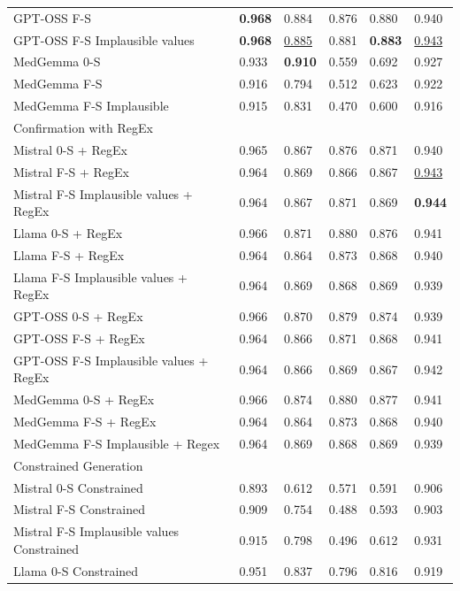 \begin{tabular}{l|llll|l}
GPT-OSS F-S  & \textbf{0.968} &  0.884  &  0.876 &  0.880 & 0.940 \\
GPT-OSS F-S Implausible values & \textbf{0.968} &  \underline{0.885}   & 0.881 &  \textbf{0.883} & \underline{0.943} \\
MedGemma 0-S  &0.933 & \textbf{0.910} & 0.559 & 0.692 & 0.927 \\
MedGemma F-S  & 0.916 & 0.794 & 0.512 & 0.623 & 0.922 \\
MedGemma F-S Implausible & 0.915 & 0.831 & 0.470 & 0.600 & 0.916 \\
\midrule
Confirmation with RegEx  & & & & & \\
\midrule
Mistral 0-S   + RegEx  & 0.965 &   0.867  & 0.876  &  0.871 & 0.940  \\ 
Mistral F-S  + RegEx  &   0.964 & 0.869  & 0.866  & 0.867   &  \underline{0.943} \\ 
Mistral F-S Implausible values + RegEx  & 0.964 & 0.867    &  0.871 &  0.869  &  \textbf{0.944}  \\
Llama 0-S  + RegEx  & 0.966 &  0.871  &  0.880 &  0.876  &  0.941 \\ 
Llama F-S  + RegEx  &  0.964  & 0.864 &  0.873 &  0.868  & 0.940  \\  
Llama F-S Implausible values + RegEx   &  0.964 &  0.869   &  0.868 &  0.869  & 0.939  \\
GPT-OSS 0-S + RegEx  & 0.966 &  0.870   & 0.879  & 0.874   & 0.939  \\
GPT-OSS F-S + RegEx  & 0.964 &  0.866   & 0.871  & 0.868   & 0.941  \\
GPT-OSS F-S Implausible values + RegEx  &  0.964 &  0.866   & 0.869  &     0.867 & 0.942 \\
MedGemma 0-S + RegEx  & 0.966 &  0.874 & 0.880  & 0.877 & 0.941  \\
MedGemma F-S + RegEx  & 0.964 & 0.864 &  0.873 &  0.868 &  0.940 \\
MedGemma F-S Implausible + Regex  & 0.964 & 0.869  & 0.868  &  0.869  & 0.939  \\
\midrule
Constrained Generation & & & & & \\
\midrule
Mistral 0-S  Constrained & 0.893  &   0.612   &   0.571 &   0.591  & 0.906  \\
Mistral F-S Constrained &  0.909  &   0.754   &  0.488   &   0.593 & 0.903   \\
Mistral F-S Implausible values Constrained & 0.915  &   0.798   &   0.496  &   0.612 & 0.931  \\
Llama 0-S Constrained &  0.951  & 0.837  &  0.796 & 0.816 & 0.919 \\

\end{tabular}
